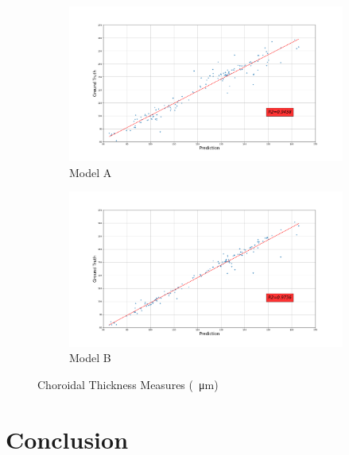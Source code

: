 \documentclass[12pt,a4paper]{scrartcl}
\begin{document}
\begin{figure}[H]
\centering
\begin{subfigure}{1\textwidth}
  \centering
  \includegraphics[width=\linewidth]{./results/model_A_choroidal_thickness.png}
  \caption{Model A}
  \label{fig:model_a_choroidal_thicknesss}
\end{subfigure}
\begin{subfigure}{1\textwidth}
  \centering
  \includegraphics[width=\linewidth]{./results/model_B_choroidal_thickness.png}
  \caption{Model B}
  \label{fig:model_b_choroidal_thickness}
\end{subfigure}
\caption{Choroidal Thickness Measures (\SI{}{\micro\metre})}
\label{fig:choroidal_thickness}
\end{figure}

\section{Conclusion}
\end{document}
